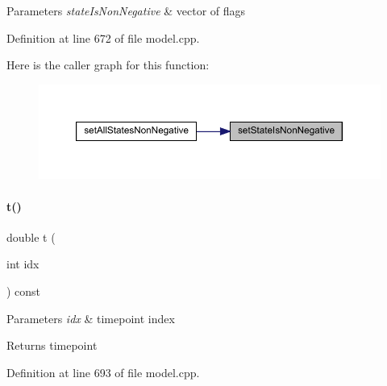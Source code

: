 \begin{DoxyParams}{Parameters}
{\em state\+Is\+Non\+Negative} & vector of flags \\
\hline
\end{DoxyParams}


Definition at line 672 of file model.\+cpp.

Here is the caller graph for this function\+:
\nopagebreak
\begin{figure}[H]
\begin{center}
\leavevmode
\includegraphics[width=350pt]{classamici_1_1_model_a0a50693322a9383d8e98390d9894e841_icgraph}
\end{center}
\end{figure}
\mbox{\label{classamici_1_1_model_a711281d57e9710226face29151cc4641}} 
\paragraph{\texorpdfstring{t()}{t()}}
{\footnotesize\ttfamily double t (\begin{DoxyParamCaption}\item[{int}]{idx }\end{DoxyParamCaption}) const}


\begin{DoxyParams}{Parameters}
{\em idx} & timepoint index \\
\hline
\end{DoxyParams}
\begin{DoxyReturn}{Returns}
timepoint 
\end{DoxyReturn}


Definition at line 693 of file model.\+cpp.

